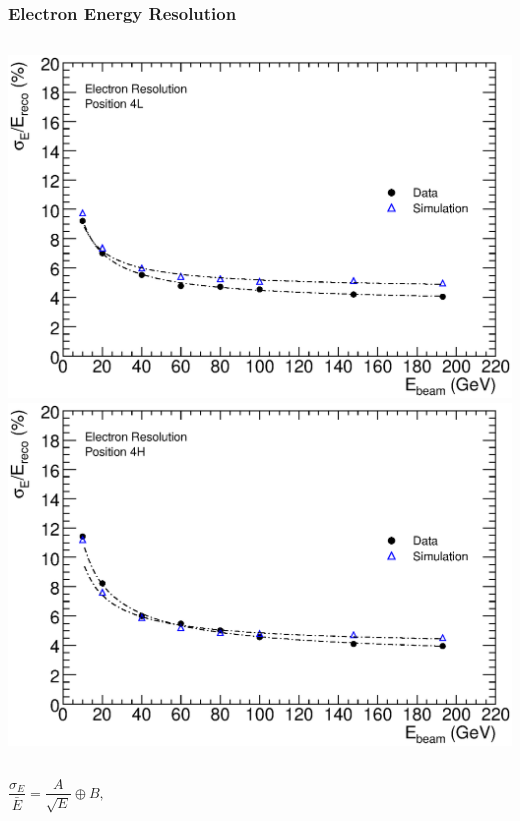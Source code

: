 \documentclass[10pt]{beamer}
\begin{document}
%
\begin{frame}\frametitle{Electron Energy Resolution}
\begin{columns}
\includegraphics[width=0.95\linewidth,angle=0]{FCalTB_plots/electron_resolution_4L.eps}
\includegraphics[width=0.95\linewidth,angle=0]{FCalTB_plots/electron_resolution_4H.eps}
\end{columns}
\begin{columns}
\begin{equation*}
\frac{\sigma_E}{\bar{E}} = \frac{A}{\sqrt{E}} \oplus B,

\end{equation*}
\end{columns}
\end{frame}
\end{document}
